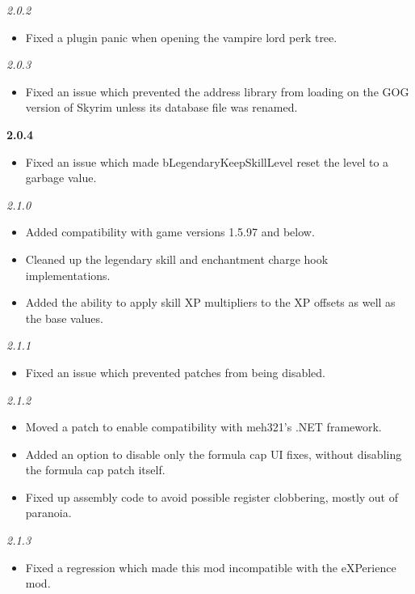 \documentclass[12pt]{amsart}
\begin{document}
\startblock
\noindent
\emph{2.0.2}
\begin{itemize}
    \item Fixed a plugin panic when opening the vampire lord perk tree.
\end{itemize}
\stopblock

\startblock
\noindent
\emph{2.0.3}
\begin{itemize}
    \item Fixed an issue which prevented the address library from loading on
          the GOG version of Skyrim unless its database file was renamed.
\end{itemize}
\stopblock

\startblock
\noindent
\textbf{2.0.4}
\begin{itemize}
    \item Fixed an issue which made bLegendaryKeepSkillLevel reset the level
          to a garbage value.
\end{itemize}
\stopblock

\startblock
\noindent
\emph{2.1.0}
\begin{itemize}
    \item Added compatibility with game versions 1.5.97 and below.
    \item Cleaned up the legendary skill and enchantment charge hook
          implementations.
    \item Added the ability to apply skill XP multipliers to the XP offsets
          as well as the base values.
\end{itemize}
\stopblock

\startblock
\noindent
\emph{2.1.1}
\begin{itemize}
    \item Fixed an issue which prevented patches from being disabled.
\end{itemize}
\stopblock

\startblock
\noindent
\emph{2.1.2}
\begin{itemize}
    \item Moved a patch to enable compatibility with meh321's .NET framework.
    \item Added an option to disable only the formula cap UI fixes, without
          disabling the formula cap patch itself.
    \item Fixed up assembly code to avoid possible register clobbering, mostly
          out of paranoia.
\end{itemize}
\stopblock

\startblock
\noindent
\emph{2.1.3}
\begin{itemize}
    \item Fixed a regression which made this mod incompatible with the
          eXPerience mod.
\end{itemize}
\stopblock
\end{document}
